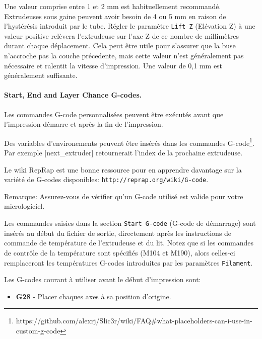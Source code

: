 Une valeur comprise entre 1 et 2 mm est habituellement recommand\'e. Extrudeuses sous gaine peuvent avoir besoin de 4 ou 5 mm en raison de l'hyst\'er\'esis introduit par le tube.
R\'egler le param\`etre \texttt{Lift Z} (El\'evation Z) \`a une valeur positive rel\`evera l'extrudeuse sur l'axe Z de ce nombre de millim\`etres durant chaque d\'eplacement. Cela peut \^etre utile pour s'assurer que la buse n'accroche pas la couche pr\'ecedente, mais cette valeur n'est g\'en\'eralement pas n\'ecessaire et ralentit la vitesse d'impression. Une valeur de 0,1 mm est g\'en\'eralement suffisante.

\paragraph{Start, End and Layer Chance G-codes.} %
\label{par:start_end_g_code}
Les commandes G-code personnalis\'ees peuvent \^etre ex\'ecut\'es avant que l'impression d\'emarre et apr\`es la fin de l'impression.

Des variables d'environements peuvent \^etre ins\'er\'es dans les commandes G-code\footnote{https://github.com/alexrj/Slic3r/wiki/FAQ\#what-placeholders-can-i-use-in-custom-g-code}.  Par exemple [next\_extruder] retournerait l'index de la prochaine extrudeuse.

Le wiki RepRap est une bonne ressource pour en apprendre davantage sur la vari\'et\'e de G-codes disponibles: \texttt{http://reprap.org/wiki/G-code}.

Remarque: Assurez-vous de v\'erifier qu'un G-code utilis\'e est valide pour votre micrologiciel.

Les commandes saisies dans la section \texttt{Start G-code} (G-code de d\'emarrage) 
sont ins\'er\'es au d\'ebut du fichier de sortie, directement apr\`es les instructions de commande de temp\'erature de l'extrudeuse et du lit. Notez que si les commandes de contr\^ole de la temp\'erature sont sp\'ecifi\'es (M104 et M190), alors celles-ci remplaceront les temp\'eratures G-codes introduites par les param\`etres \texttt{Filament}.

Les G-codes courant \`a utiliser avant le d\'ebut d'impression sont:
\begin{itemize}
	\item \textbf{G28}  - Placer chaques axes \`a sa position d'origine.
\end{itemize}


